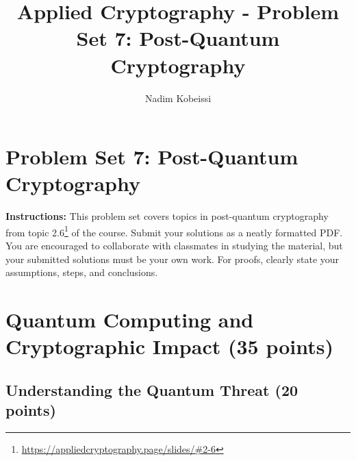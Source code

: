 \documentclass[10pt,a4paper,american]{exam}
\title{Applied Cryptography - Problem Set 7: Post-Quantum Cryptography}
\author{Nadim Kobeissi}
\begin{document}
\classhandoutheader
\section*{Problem Set 7: Post-Quantum Cryptography}

\begin{tcolorbox}[colframe=OliveGreen!30!white,colback=OliveGreen!5!white]
	\textbf{Instructions:} This problem set covers topics in post-quantum cryptography from topic 2.6\footnote{\url{https://appliedcryptography.page/slides/\#2-6}} of the course. Submit your solutions as a neatly formatted PDF. You are encouraged to collaborate with classmates in studying the material, but your submitted solutions must be your own work. For proofs, clearly state your assumptions, steps, and conclusions.
\end{tcolorbox}

\section{Quantum Computing and Cryptographic Impact (35 points)}

\subsection{Understanding the Quantum Threat (20 points)}
\end{document}
